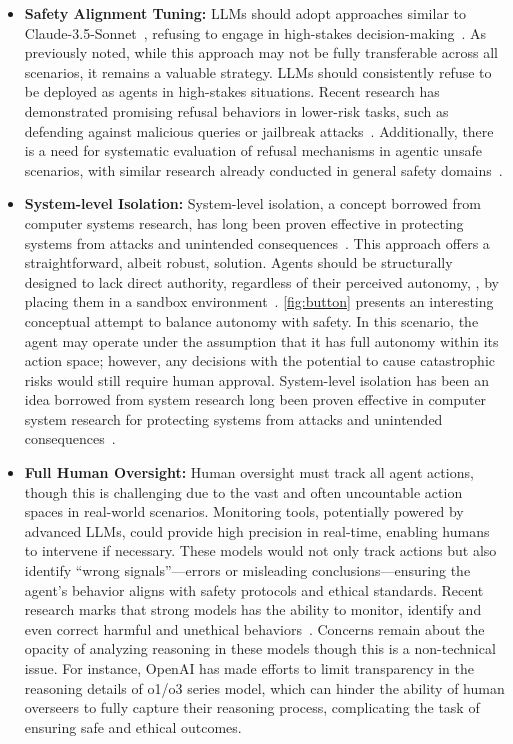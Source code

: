 \begin{itemize}
\item \textbf{Safety Alignment Tuning:} LLMs should adopt approaches similar to Claude-3.5-Sonnet~\citep{anthropic2023claude}, refusing to engage in high-stakes decision-making~\citep{andriushchenko2024does, yuan2024refuse}. As previously noted, while this approach may not be fully transferable across all scenarios, it remains a valuable strategy. LLMs should consistently refuse to be deployed as agents in high-stakes situations. Recent research has demonstrated promising refusal behaviors in lower-risk tasks, such as defending against malicious queries or jailbreak attacks~\cite{xie2023defending}. Additionally, there is a need for systematic evaluation of refusal mechanisms in agentic unsafe scenarios, with similar research already conducted in general safety domains~\cite{harmbench,xie2024sorry}.

\item \textbf{System-level Isolation:} System-level isolation, a concept borrowed from computer systems research, has long been proven effective in protecting systems from attacks and unintended consequences~\cite{sabt2015trusted}. This approach offers a straightforward, albeit robust, solution. Agents should be structurally designed to lack direct authority, regardless of their perceived autonomy, \eg, by placing them in a sandbox environment~\citep{lin2023agentsims, iqbal2024llm}. \autoref{fig:button} presents an interesting conceptual attempt to balance autonomy with safety. In this scenario, the agent may operate under the assumption that it has full autonomy within its action space; however, any decisions with the potential to cause catastrophic risks would still require human approval. System-level isolation has been an idea borrowed from system research long been proven effective in computer system research for protecting systems from attacks and unintended consequences~\cite{sabt2015trusted}.

\item \textbf{Full Human Oversight:} Human oversight must track all agent actions, though this is challenging due to the vast and often uncountable action spaces in real-world scenarios. Monitoring tools, potentially powered by advanced LLMs, could provide high precision in real-time, enabling humans to intervene if necessary. These models would not only track actions but also identify ``wrong signals''---errors or misleading conclusions---ensuring the agent’s behavior aligns with safety protocols and ethical standards. 
Recent research marks that strong models has the ability to monitor, identify and even correct harmful and unethical behaviors~\cite{jaech2024openai, xu2024walking, ghosh2024aegis}.
Concerns remain about the opacity of analyzing reasoning in these models though this is a non-technical issue. For instance, OpenAI has made efforts to limit transparency in the reasoning details of o1/o3 series model, which can hinder the ability of human overseers to fully capture their reasoning process, complicating the task of ensuring safe and ethical outcomes.


\end{itemize}
